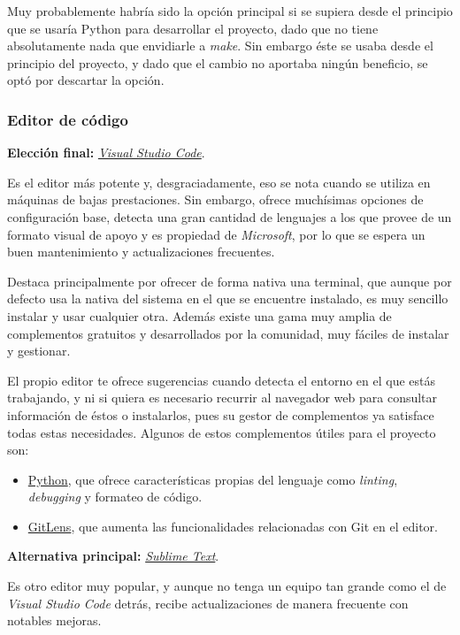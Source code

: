 Muy probablemente habría sido la opción principal si se supiera desde el principio que se usaría Python para desarrollar el proyecto, dado que no tiene absolutamente nada que envidiarle a \textit{make}. Sin embargo éste se usaba desde el principio del proyecto, y dado que el cambio no aportaba ningún beneficio, se optó por descartar la opción.

\subsubsection{Editor de código}

\textbf{Elección final:} \href{https://code.visualstudio.com/}{\textit{Visual Studio Code}}.

Es el editor más potente y, desgraciadamente, eso se nota cuando se utiliza en máquinas de bajas prestaciones. Sin embargo, ofrece muchísimas opciones de configuración base, detecta una gran cantidad de lenguajes a los que provee de un formato visual de apoyo y es propiedad de \textit{Microsoft}, por lo que se espera un buen mantenimiento y actualizaciones frecuentes.

Destaca principalmente por ofrecer de forma nativa una terminal, que aunque por defecto usa la nativa del sistema en el que se encuentre instalado, es muy sencillo instalar y usar cualquier otra. Además existe una gama muy amplia de complementos gratuitos y desarrollados por la comunidad, muy fáciles de instalar y gestionar. 

El propio editor te ofrece sugerencias cuando detecta el entorno en el que estás trabajando, y ni si quiera es necesario recurrir al navegador web para consultar información de éstos o instalarlos, pues su gestor de complementos ya satisface todas estas necesidades. Algunos de estos complementos útiles para el proyecto son:
\begin{itemize}
    \item \href{https://marketplace.visualstudio.com/items?itemName=ms-python.python}{Python}, que ofrece características propias del lenguaje como \textit{linting}, \textit{debugging} y formateo de código.
    \item \href{https://marketplace.visualstudio.com/items?itemName=eamodio.gitlens}{GitLens}, que aumenta las funcionalidades relacionadas con Git en el editor.
\end{itemize}

\textbf{Alternativa principal:} \href{https://www.sublimetext.com/}{\textit{Sublime Text}}.

Es otro editor muy popular, y aunque no tenga un equipo tan grande como el de \textit{Visual Studio Code} detrás, recibe actualizaciones de manera frecuente con notables mejoras.

